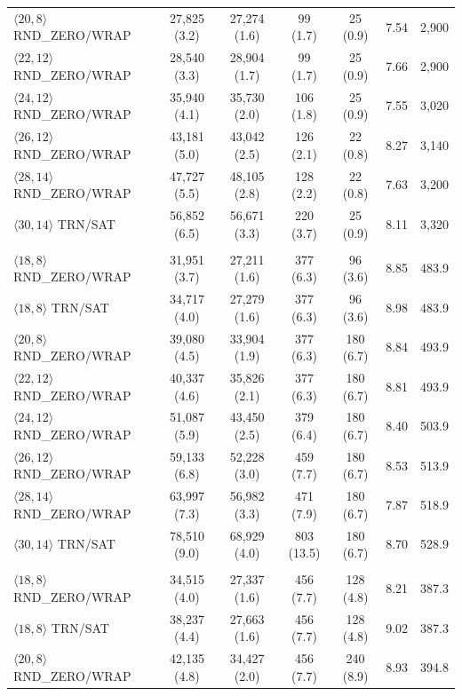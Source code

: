\begin{table}[p]
\begin{tabular}{lcccccc}
$\langle 20,8\rangle$ RND\_ZERO/WRAP & 27,825 (3.2) & 27,274 (1.6) & 99 (1.7) & 25 (0.9) & 7.54 & 2,900 \\
$\langle 22,12\rangle$ RND\_ZERO/WRAP & 28,540 (3.3) & 28,904 (1.7) & 99 (1.7) & 25 (0.9) & 7.66 & 2,900 \\
$\langle 24,12\rangle$ RND\_ZERO/WRAP & 35,940 (4.1) & 35,730 (2.0) & 106 (1.8) & 25 (0.9) & 7.55 & 3,020 \\
$\langle 26,12\rangle$ RND\_ZERO/WRAP & 43,181 (5.0) & 43,042 (2.5) & 126 (2.1) & 22 (0.8) & 8.27 & 3,140 \\
$\langle 28,14\rangle$ RND\_ZERO/WRAP & 47,727 (5.5) & 48,105 (2.8) & 128 (2.2) & 22 (0.8) & 7.63 & 3,200 \\
$\langle 30,14\rangle$ TRN/SAT & 56,852 (6.5) & 56,671 (3.3) & 220 (3.7) & 25 (0.9) & 8.11 & 3,320 \\
\addlinespace
\multicolumn{7}{l}{\textbf{TDLA30-75 (limit: 606 cycles)}} \\
$\langle 18,8\rangle$ RND\_ZERO/WRAP & 31,951 (3.7) & 27,211 (1.6) & 377 (6.3) & 96 (3.6) & 8.85 & 483.9 \\
$\langle 18,8\rangle$ TRN/SAT & 34,717 (4.0) & 27,279 (1.6) & 377 (6.3) & 96 (3.6) & 8.98 & 483.9 \\
$\langle 20,8\rangle$ RND\_ZERO/WRAP & 39,080 (4.5) & 33,904 (1.9) & 377 (6.3) & 180 (6.7) & 8.84 & 493.9 \\
$\langle 22,12\rangle$ RND\_ZERO/WRAP & 40,337 (4.6) & 35,826 (2.1) & 377 (6.3) & 180 (6.7) & 8.81 & 493.9 \\
$\langle 24,12\rangle$ RND\_ZERO/WRAP & 51,087 (5.9) & 43,450 (2.5) & 379 (6.4) & 180 (6.7) & 8.40 & 503.9 \\
$\langle 26,12\rangle$ RND\_ZERO/WRAP & 59,133 (6.8) & 52,228 (3.0) & 459 (7.7) & 180 (6.7) & 8.53 & 513.9 \\
$\langle 28,14\rangle$ RND\_ZERO/WRAP & 63,997 (7.3) & 56,982 (3.3) & 471 (7.9) & 180 (6.7) & 7.87 & 518.9 \\
$\langle 30,14\rangle$ TRN/SAT & 78,510 (9.0) & 68,929 (4.0) & 803 (13.5) & 180 (6.7) & 8.70 & 528.9 \\
\addlinespace
\multicolumn{7}{l}{\textbf{TDLC300-100 (limit: 454 cycles)}} \\
$\langle 18,8\rangle$ RND\_ZERO/WRAP & 34,515 (4.0) & 27,337 (1.6) & 456 (7.7) & 128 (4.8) & 8.21 & 387.3 \\
$\langle 18,8\rangle$ TRN/SAT & 38,237 (4.4) & 27,663 (1.6) & 456 (7.7) & 128 (4.8) & 9.02 & 387.3 \\
$\langle 20,8\rangle$ RND\_ZERO/WRAP & 42,135 (4.8) & 34,427 (2.0) & 456 (7.7) & 240 (8.9) & 8.93 & 394.8 \\

\end{tabular}
\end{table}
